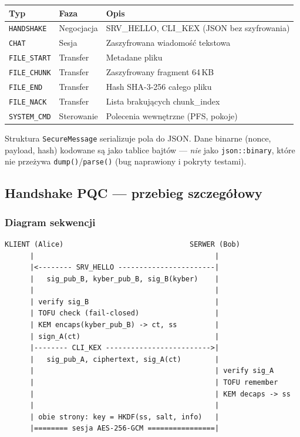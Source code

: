 \documentclass[12pt,a4paper]{article}
\begin{document}
\begin{table}[H]
\centering
\begin{tabular}{@{}llp{7.5cm}@{}}
\toprule
\textbf{Typ} & \textbf{Faza} & \textbf{Opis} \\
\midrule
\texttt{HANDSHAKE} & Negocjacja & SRV\_HELLO, CLI\_KEX (JSON bez szyfrowania) \\
\texttt{CHAT} & Sesja & Zaszyfrowana wiadomość tekstowa \\
\texttt{FILE\_START} & Transfer & Metadane pliku \\
\texttt{FILE\_CHUNK} & Transfer & Zaszyfrowany fragment 64\,KB \\
\texttt{FILE\_END} & Transfer & Hash SHA-3-256 całego pliku \\
\texttt{FILE\_NACK} & Transfer & Lista brakujących chunk\_index \\
\texttt{SYSTEM\_CMD} & Sterowanie & Polecenia wewnętrzne (PFS, pokoje) \\
\bottomrule
\end{tabular}
\end{table}

Struktura \texttt{SecureMessage} serializuje pola do JSON. Dane binarne (nonce, payload, hash) kodowane są jako tablice bajtów --- \emph{nie} jako \texttt{json::binary}, które nie przeżywa \texttt{dump()}/\texttt{parse()} (bug naprawiony i pokryty testami).

\subsection{Handshake PQC --- przebieg szczegółowy}

\subsubsection{Diagram sekwencji}

\begin{lstlisting}[caption={Handshake Quill (uproszczony).}]
KLIENT (Alice)                              SERWER (Bob)
      |                                           |
      |<-------- SRV_HELLO -----------------------|
      |   sig_pub_B, kyber_pub_B, sig_B(kyber)    |
      |                                           |
      | verify sig_B                              |
      | TOFU check (fail-closed)                  |
      | KEM encaps(kyber_pub_B) -> ct, ss         |
      | sign_A(ct)                                |
      |-------- CLI_KEX ------------------------->|
      |   sig_pub_A, ciphertext, sig_A(ct)        |
      |                                           | verify sig_A
      |                                           | TOFU remember
      |                                           | KEM decaps -> ss
      |                                           |
      | obie strony: key = HKDF(ss, salt, info)   |
      |======== sesja AES-256-GCM ================|
\end{lstlisting}
\end{document}
